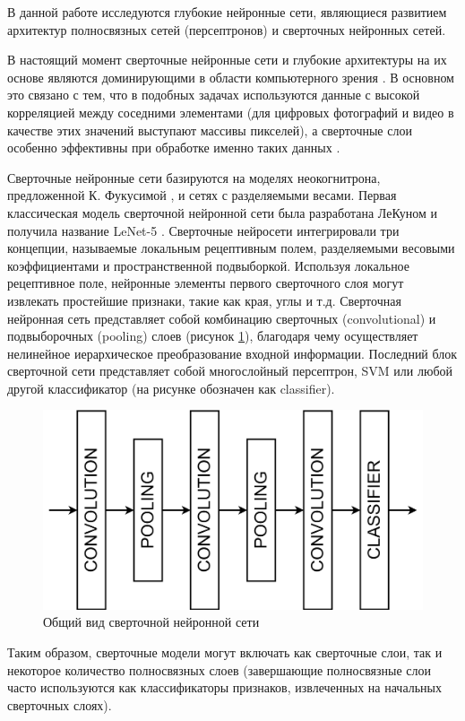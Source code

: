 В данной работе исследуются глубокие нейронные сети, являющиеся развитием архитектур полносвязных сетей (персептронов) и сверточных нейронных сетей.

В настоящий момент сверточные нейронные сети и глубокие архитектуры на их основе являются доминирующими в области компьютерного зрения \cite{LeCun2015}. В основном это связано с тем, что в подобных задачах используются данные с высокой корреляцией между соседними элементами (для цифровых фотографий и видео в качестве этих значений выступают массивы пикселей), а сверточные слои особенно эффективны при обработке именно таких данных \cite{Emmert2020}.

Сверточные нейронные сети базируются на моделях неокогнитрона, предложенной К. Фукусимой \cite{fukushima1980}, и сетях с разделяемыми весами. Первая классическая модель сверточной нейронной сети была разработана ЛеКуном и получила название LeNet-5 \cite{lekun1998}. Сверточные нейросети интегрировали три концепции, называемые локальным рецептивным полем, разделяемыми весовыми коэффициентами и пространственной подвыборкой. Используя локальное рецептивное поле, нейронные элементы первого сверточного слоя могут извлекать простейшие признаки, такие как края, углы и т.д. Сверточная нейронная сеть представляет собой комбинацию сверточных (convolutional) и подвыборочных (pooling) слоев (рисунок \ref{fig:cnn_common_view}), благодаря чему осуществляет нелинейное иерархическое преобразование входной информации. Последний блок сверточной сети представляет собой многослойный персептрон, SVM или любой другой классификатор (на рисунке обозначен как classifier).

\begin{figure}[ht]
	\centering
	\includegraphics[width=14cm]{man-source/images/ch4/pic4-15.png}
	\caption{Общий вид сверточной нейронной сети}
	\label{fig:cnn_common_view}
\end{figure}
Таким образом, сверточные модели могут включать как сверточные слои, так и некоторое количество полносвязных слоев (завершающие полносвязные слои часто используются как классификаторы признаков, извлеченных на начальных сверточных слоях). %

